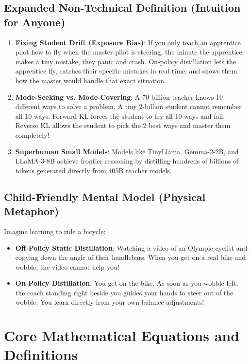 \documentclass[11pt,a4paper]{article}
\theoremstyle{definition}
\begin{document}
\subsection{Expanded Non-Technical Definition (Intuition for Anyone)}
\begin{enumerate}
    \item \textbf{Fixing Student Drift (Exposure Bias)}: If you only teach an apprentice pilot how to fly when the master pilot is steering, the minute the apprentice makes a tiny mistake, they panic and crash. On-policy distillation lets the apprentice fly, catches their specific mistakes in real time, and shows them how the master would handle that exact situation.
    \item \textbf{Mode-Seeking vs. Mode-Covering}: A 70-billion teacher knows 10 different ways to solve a problem. A tiny 2-billion student cannot remember all 10 ways. Forward KL forces the student to try all 10 ways and fail. Reverse KL allows the student to pick the 2 best ways and master them completely!
    \item \textbf{Superhuman Small Models}: Models like TinyLlama, Gemma-2-2B, and LLaMA-3-8B achieve frontier reasoning by distilling hundreds of billions of tokens generated directly from 405B teacher models.
\end{enumerate}

\subsection{Child-Friendly Mental Model (Physical Metaphor)}
Imagine learning to ride a bicycle:
\begin{itemize}
    \item \textbf{Off-Policy Static Distillation}: Watching a video of an Olympic cyclist and copying down the angle of their handlebars. When you get on a real bike and wobble, the video cannot help you!
    \item \textbf{On-Policy Distillation}: You get on the bike. As soon as you wobble left, the coach standing right beside you guides your hands to steer out of the wobble. You learn directly from your own balance adjustments!
\end{itemize}

\section{Core Mathematical Equations and Definitions}
\end{document}

